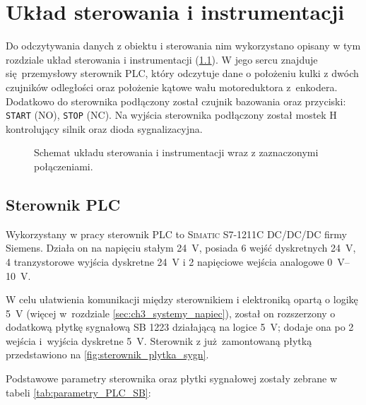 \chapter{Układ sterowania i instrumentacji}
\label{cha:ch3_uklad_ster_i_instrumentacji}

Do odczytywania danych z obiektu i sterowania nim wykorzystano opisany w tym rozdziale układ sterowania i instrumentacji (\cref{fig:schemat_ukl_sterowania_instrumentacji}). W jego sercu znajduje się przemysłowy sterownik PLC, który odczytuje dane o położeniu kulki z dwóch czujników odległości oraz położenie kątowe wału motoreduktora z~enkodera. Dodatkowo do sterownika podłączony został czujnik bazowania oraz przyciski: \texttt{START} (NO), \texttt{STOP} (NC). Na wyjścia sterownika podłączony został mostek H kontrolujący silnik oraz dioda sygnalizacyjna.

\begin{figure}[H]
    \centering
    
    \caption{Schemat układu sterowania i instrumentacji wraz z zaznaczonymi połączeniami.}
    \label{fig:schemat_ukl_sterowania_instrumentacji}
\end{figure}

\section{Sterownik PLC}
\label{sec:ch3_PLC}

Wykorzystany w pracy sterownik PLC to \textsc{Simatic S7-1211C DC/DC/DC} firmy Siemens. Działa on na napięciu stałym \SI{24}{V}, posiada 6 wejść dyskretnych \SI{24}{V}, 4 tranzystorowe wyjścia dyskretne \SI{24}{V} i 2 napięciowe wejścia analogowe \SIrange{0}{10}{V}.

W celu ułatwienia komunikacji między sterownikiem i elektroniką opartą o logikę \SI{5}{V} (więcej w~rozdziale \ref{sec:ch3_systemy_napiec}), został on rozszerzony o dodatkową płytkę sygnałową SB 1223 działającą na logice \SI{5}{V}; dodaje ona po 2 wejścia i~wyjścia dyskretne \SI{5}{V}. Sterownik z już zamontowaną płytką przedstawiono na \cref{fig:sterownik_plytka_sygn}.

Podstawowe parametry sterownika oraz płytki sygnałowej zostały zebrane w tabeli \ref{tab:parametry_PLC_SB}:

